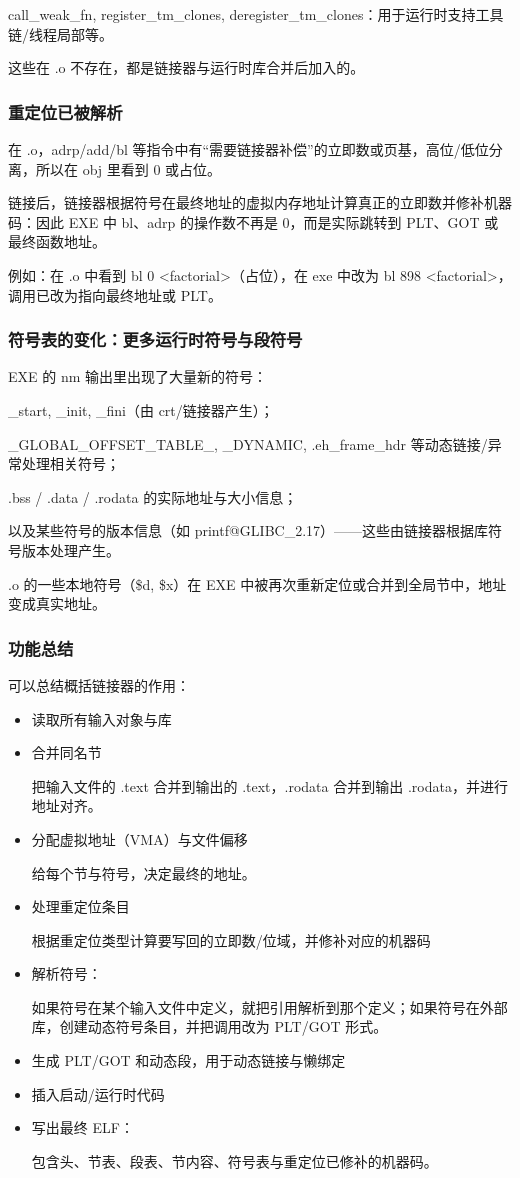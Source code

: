 \documentclass[a4paper]{article}
\begin{document}
call\_weak\_fn, register\_tm\_clones, deregister\_tm\_clones：用于运行时支持工具链/线程局部等。

这些在 .o 不存在，都是链接器与运行时库合并后加入的。

\subsubsection{重定位已被解析}
 在 .o，adrp/add/bl 等指令中有“需要链接器补偿”的立即数或页基，高位/低位分离，所以在 obj 里看到 0 或占位。
 
链接后，链接器根据符号在最终地址的虚拟内存地址计算真正的立即数并修补机器码：因此 EXE 中 bl、adrp 的操作数不再是 0，而是实际跳转到 PLT、GOT 或最终函数地址。

例如：在 .o 中看到 bl 0 <factorial>（占位），在 exe 中改为 bl 898 <factorial>，调用已改为指向最终地址或 PLT。

\subsubsection{符号表的变化：更多运行时符号与段符号}
EXE 的 nm 输出里出现了大量新的符号：

   \_start, \_init, \_fini（由 crt/链接器产生）；
   
   \_GLOBAL\_OFFSET\_TABLE\_, \_DYNAMIC, .eh\_frame\_hdr 等动态链接/异常处理相关符号；
   
   .bss / .data / .rodata 的实际地址与大小信息；
   
以及某些符号的版本信息（如 printf@GLIBC\_2.17）——这些由链接器根据库符号版本处理产生。

.o 的一些本地符号（\$d, \$x）在 EXE 中被再次重新定位或合并到全局节中，地址变成真实地址。
\subsubsection{功能总结}
可以总结概括链接器的作用：
\begin{itemize}
	\item 读取所有输入对象与库
	\item 合并同名节
	
	把输入文件的 .text 合并到输出的 .text，.rodata 合并到输出 .rodata，并进行地址对齐。
	\item 分配虚拟地址（VMA）与文件偏移 
	
	给每个节与符号，决定最终的地址。
	\item 处理重定位条目
	
	根据重定位类型计算要写回的立即数/位域，并修补对应的机器码
	\item 解析符号：
	
	如果符号在某个输入文件中定义，就把引用解析到那个定义；如果符号在外部库，创建动态符号条目，并把调用改为 PLT/GOT 形式。
	\item 生成 PLT/GOT 和动态段，用于动态链接与懒绑定
	\item 插入启动/运行时代码
	\item 写出最终 ELF：
	
	包含头、节表、段表、节内容、符号表与重定位已修补的机器码。
\end{itemize}
\end{document}

